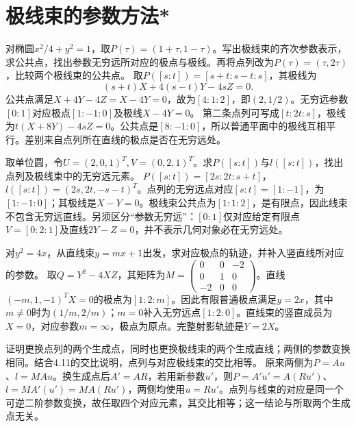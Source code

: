 \par\addvspace{12pt}

\section{极线束的参数方法*}

对椭圆\(x^2/4+y^2=1\)，取\(P(\tau)=(1+\tau,1-\tau)\)。写出极线束的齐次参数表示，求公共点，找出参数无穷远所对应的极点与极线。再将点列改为\(P(\tau)=(\tau,2\tau)\)，比较两个极线束的公共点。
\solutionanswer
取\(P([s:t])=[s+t:s-t:s]\)，其极线为
\[
 (s+t)X+4(s-t)Y-4sZ=0.
\]
公共点满足\(X+4Y-4Z=X-4Y=0\)，故为\([4:1:2]\)，即\((2,1/2)\)。无穷远参数\([0:1]\)对应极点\([1:-1:0]\)及极线\(X-4Y=0\)。
第二条点列可写成\([t:2t:s]\)，极线为\(t(X+8Y)-4sZ=0\)。公共点是\([8:-1:0]\)，所以普通平面中的极线互相平行。差别来自点列所在直线的极点是否在无穷远处。


取单位圆，令\(U=(2,0,1)^T,V=(0,2,1)^T\)。求\(P([s:t])\)与\(l([s:t])\)，找出点列及极线束中的无穷远元素。
\solutionanswer
\(P([s:t])=[2s:2t:s+t]\)，\(l([s:t])=(2s,2t,-s-t)^T\)。点列的无穷远点对应\([s:t]=[1:-1]\)，为\([1:-1:0]\)；其极线是\(X-Y=0\)。极线束公共点为\([1:1:2]\)，是有限点，因此线束不包含无穷远直线。另须区分“参数无穷远”：\([0:1]\)仅对应给定有限点\(V=[0:2:1]\)及直线\(2Y-Z=0\)，并不表示几何对象必在无穷远处。


对\(y^2=4x\)，从直线束\(y=mx+1\)出发，求对应极点的轨迹，并补入竖直线所对应的参数。
\solutionanswer
取\(Q=Y^2-4XZ\)，其矩阵为\(M=\left(\begin{smallmatrix}0&0&-2\\0&1&0\\-2&0&0\end{smallmatrix}\right)\)。直线\((-m,1,-1)^TX=0\)的极点为\([1:2:m]\)。因此有限普通极点满足\(y=2x\)，其中\(m\ne0\)时为\((1/m,2/m)\)；\(m=0\)补入无穷远点\([1:2:0]\)。直线束的竖直成员为\(X=0\)，对应参数\(m=\infty\)，极点为原点。完整射影轨迹是\(Y=2X\)。


证明更换点列的两个生成点，同时也更换极线束的两个生成直线；两侧的参数变换相同。结合4.11的交比说明，点列与对应极线束的交比相等。
\solutionanswer
原来两侧为\(P=Au\)、\(l=MAu\)。换生成点后\(A'=AR\)，若用新参数\(u'\)，则\(P=A' u'=A(Ru')\)、\(l=MA'(u')=MA(Ru')\)，两侧均使用\(u=Ru'\)。点列与线束的对应是同一个可逆二阶参数变换，故任取四个对应元素，其交比相等；这一结论与所取两个生成点无关。


